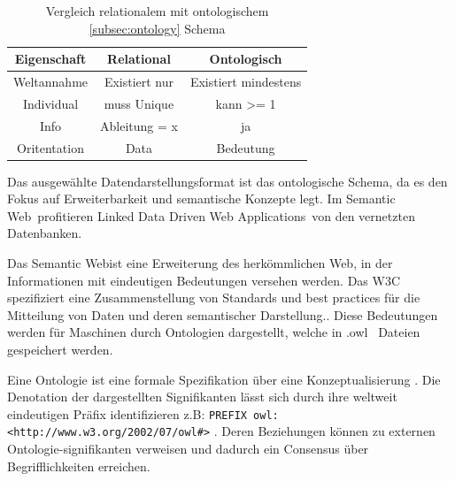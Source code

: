 \documentclass[
12pt,
english,
ngerman,
headsepline,
twoside,
openright,
numbers=noenddot,version=first
]{scrreprt}
\providecommand{\tabularnewline}{\\}
\begin{document}
\begin{table}[h]
	\caption{Vergleich relationalem mit ontologischem \ref{subsec:ontology} Schema}
	\centering{}
	\begin{tabular}{ccc}
		\noalign{\vskip\doublerulesep}
		Eigenschaft & Relational & Ontologisch \tabularnewline[\doublerulesep]
		\hline\noalign{\vskip\doublerulesep}
		Weltannahme & Existiert nur & Existiert mindestens \tabularnewline[\doublerulesep]
		\noalign{\vskip\doublerulesep}
		Individual & muss Unique & kann >= 1 \tabularnewline[\doublerulesep]
		\noalign{\vskip\doublerulesep}
		Info & Ableitung = x & ja \tabularnewline[\doublerulesep]
		\noalign{\vskip\doublerulesep}
		Oritentation & Data & Bedeutung \tabularnewline[\doublerulesep]
		
	\end{tabular}
\end{table}

Das ausgewählte Datendarstellungsformat ist das ontologische Schema, da es den Fokus auf Erweiterbarkeit und semantische Konzepte legt.
Im \glqq Semantic Web\grqq\ profitieren \glqq Linked Data Driven Web Applications\grqq\ von den vernetzten Datenbanken.
\cite{W3C}


Das \glqq Semantic Web\grqq ist eine Erweiterung des herkömmlichen Web, in der Informationen mit eindeutigen Bedeutungen versehen werden\cite{ontoWhat2}. Das \acrfull{W3C} spezifiziert eine Zusammenstellung von Standards und best practices für die Mitteilung von Daten und deren semantischer Darstellung.\cite{sparqlLearn}.
Diese Bedeutungen werden für Maschinen durch Ontologien dargestellt, welche in \glqq .owl \grqq\ Dateien gespeichert werden.\cite{W3C}



Eine Ontologie\label{subsec:ontology} ist eine formale Spezifikation über eine Konzeptualisierung \cite{ontoWhat}. Die Denotation der dargestellten Signifikanten lässt sich durch ihre weltweit eindeutigen Präfix identifizieren z.B: \lstinline|PREFIX owl: <http://www.w3.org/2002/07/owl#>|  \cite{W3C}. Deren Beziehungen können zu externen Ontologie-signifikanten verweisen und dadurch ein Consensus über Begrifflichkeiten erreichen. 
\end{document}
